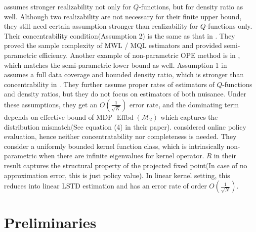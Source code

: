 \documentclass{article}
\def\mw#1{\textcolor{red}{mw:#1}}
\numberwithin{equation}{section}
\theoremstyle{plain}
\theoremstyle{definition}
\theoremstyle{remark}
\begin{document}
\citep{uehara2020minimax} assumes stronger realizability not only for $Q$-functions, but for density ratio as well. Although two realizability are not necessary for their finite upper bound, they still need certain assumption stronger than realizability for $Q$-functions only. Their concentrability condition(Assumption 2) is the same as that in \citep{chen2019information}. They proved the sample complexity of MWL / MQL estimators and provided semi-parametric efficiency. Another example of non-parametric OPE method is in \citep{kallus2020double}, which matches the semi-parametric lower bound as well. Assumption 1 in \citep{kallus2020double} assumes a full data coverage and bounded density ratio, which is stronger than concentrability in \citep{chen2019information}. They further assume proper rates of estimators of $Q$-functions and density ratios, but they do not focus on estimators of both nuisance. Under these assumptions, they get an $O(\frac{1}{\sqrt{K}})$ error rate, and the dominating term depends on effective bound of MDP $\operatorname{Effbd}\left(\mathcal{M}_{2}\right)$ which captures the distribution mismatch(See equation (4) in their paper). \citep{duan2021optimal} considered online policy evaluation, hence neither concentratability nor completeness is needed. They consider a uniformly bounded kernel function class, which is intrinsically non-parametric when there are infinite eigenvalues for kernel operator. $R$ in their result captures the structural property of the projected fixed point(In case of no approximation error, this is just policy value). In linear kernel setting, this reduces into linear LSTD estimation and has an error rate of order $O(\frac{1}{\sqrt{N}}).$


\section{Preliminaries}
\end{document}
